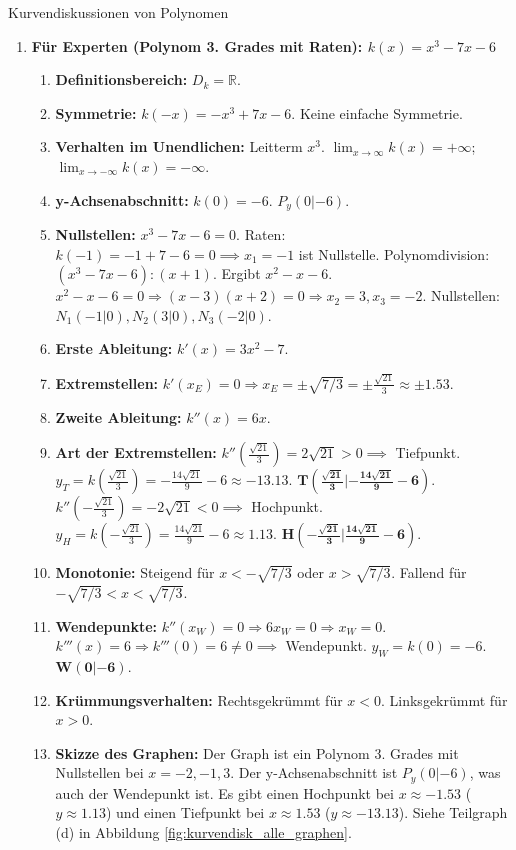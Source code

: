 \begin{loesungsumgebung}{Kurvendiskussionen von Polynomen}
\begin{enumerate}[label=(\alph*)]
    \item \textbf{Für Experten (Polynom 3. Grades mit Raten): $k(x) = x^3 - 7x - 6$}
    \begin{enumerate}[label=\arabic*.]
        \item \textbf{Definitionsbereich:} $D_k = \mathbb{R}$.
        \item \textbf{Symmetrie:} $k(-x) = -x^3+7x-6$. Keine einfache Symmetrie.
        \item \textbf{Verhalten im Unendlichen:} Leitterm $x^3$. $\lim_{x \to \infty} k(x) = +\infty$; $\lim_{x \to -\infty} k(x) = -\infty$.
        \item \textbf{y-Achsenabschnitt:} $k(0) = -6$. $P_y(0|-6)$.
        \item \textbf{Nullstellen:} $x^3 - 7x - 6 = 0$. Raten: $k(-1) = -1+7-6=0 \implies x_1=-1$ ist Nullstelle.
        Polynomdivision: $(x^3 - 7x - 6) : (x+1)$.
        Ergibt $x^2 - x - 6$.
        $x^2 - x - 6 = 0 \Rightarrow (x-3)(x+2)=0 \Rightarrow x_2=3, x_3=-2$.
        Nullstellen: $N_1(-1|0), N_2(3|0), N_3(-2|0)$.
        \item \textbf{Erste Ableitung:} $k'(x) = 3x^2 - 7$.
        \item \textbf{Extremstellen:} $k'(x_E)=0 \Rightarrow x_E = \pm\sqrt{7/3} = \pm \frac{\sqrt{21}}{3} \approx \pm 1.53$.
        \item \textbf{Zweite Ableitung:} $k''(x) = 6x$.
        \item \textbf{Art der Extremstellen:}
        $k''(\frac{\sqrt{21}}{3}) = 2\sqrt{21} > 0 \implies$ Tiefpunkt.
        $y_T = k(\frac{\sqrt{21}}{3}) = -\frac{14\sqrt{21}}{9}-6 \approx -13.13$. $\mathbf{T(\frac{\sqrt{21}}{3}|-\frac{14\sqrt{21}}{9}-6)}$.
        $k''(-\frac{\sqrt{21}}{3}) = -2\sqrt{21} < 0 \implies$ Hochpunkt.
        $y_H = k(-\frac{\sqrt{21}}{3}) = \frac{14\sqrt{21}}{9}-6 \approx 1.13$. $\mathbf{H(-\frac{\sqrt{21}}{3}|\frac{14\sqrt{21}}{9}-6)}$.
        \item \textbf{Monotonie:} Steigend für $x < -\sqrt{7/3}$ oder $x > \sqrt{7/3}$. Fallend für $-\sqrt{7/3} < x < \sqrt{7/3}$.
        \item \textbf{Wendepunkte:} $k''(x_W)=0 \Rightarrow 6x_W=0 \Rightarrow x_W=0$.
        $k'''(x)=6 \Rightarrow k'''(0)=6 \neq 0 \implies$ Wendepunkt.
        $y_W = k(0)=-6$. $\mathbf{W(0|-6)}$.
        \item \textbf{Krümmungsverhalten:} Rechtsgekrümmt für $x < 0$. Linksgekrümmt für $x > 0$.
        \item \textbf{Skizze des Graphen:} Der Graph ist ein Polynom 3. Grades mit Nullstellen bei $x=-2, -1, 3$. Der y-Achsenabschnitt ist $P_y(0|-6)$, was auch der Wendepunkt ist. Es gibt einen Hochpunkt bei $x \approx -1.53$ ($y \approx 1.13$) und einen Tiefpunkt bei $x \approx 1.53$ ($y \approx -13.13$). Siehe Teilgraph (d) in Abbildung \ref{fig:kurvendisk_alle_graphen}.
    \end{enumerate}


\end{enumerate}
\end{loesungsumgebung}
